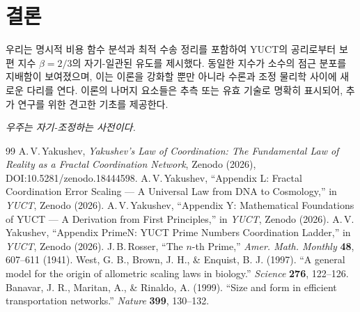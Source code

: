 \documentclass[11pt,a4paper]{article}
\begin{document}
	\section{결론}
	우리는 명시적 비용 함수 분석과 최적 수송 정리를 포함하여 YUCT의 공리로부터 보편 지수 \(\beta = 2/3\)의 자기-일관된 유도를 제시했다. 동일한 지수가 소수의 점근 분포를 지배함이 보여졌으며, 이는 이론을 강화할 뿐만 아니라 수론과 조정 물리학 사이에 새로운 다리를 연다. 이론의 나머지 요소들은 추측 또는 유효 기술로 명확히 표시되어, 추가 연구를 위한 견고한 기초를 제공한다.
	
	\begin{center}
		\textit{우주는 자기-조정하는 사전이다.}
	\end{center}
	
	\begin{thebibliography}{99}
		A.\,V.\,Yakushev, \emph{Yakushev's Law of Coordination: The Fundamental Law of Reality as a Fractal Coordination Network}, Zenodo (2026), DOI:10.5281/zenodo.18444598.
		A.\,V.\,Yakushev, ``Appendix L: Fractal Coordination Error Scaling — A Universal Law from DNA to Cosmology,'' in \emph{YUCT}, Zenodo (2026).
		A.\,V.\,Yakushev, ``Appendix Y: Mathematical Foundations of YUCT — A Derivation from First Principles,'' in \emph{YUCT}, Zenodo (2026).
		A.\,V.\,Yakushev, ``Appendix PrimeN: YUCT Prime Numbers Coordination Ladder,'' in \emph{YUCT}, Zenodo (2026).
		J.\,B.\,Rosser, ``The \(n\)-th Prime,'' \emph{Amer. Math. Monthly} \textbf{48}, 607--611 (1941).
		West, G. B., Brown, J. H., \& Enquist, B. J. (1997). ``A general model for the origin of allometric scaling laws in biology.'' \emph{Science} \textbf{276}, 122--126.
		Banavar, J. R., Maritan, A., \& Rinaldo, A. (1999). ``Size and form in efficient transportation networks.'' \emph{Nature} \textbf{399}, 130--132.
	\end{thebibliography}
	
\end{document}
